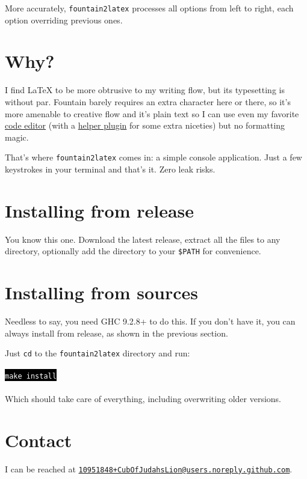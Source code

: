 \documentclass[11pt]{article}
\newcommand{\link}[2]{\textcolor{Blue}{\href{#1}{#2}}}
\newcommand{\cmdline}[1]{    \hspace{0.5in}\colorbox{Black}{\textcolor{White}{\texttt{#1}}}}
\begin{document}
More accurately, \texttt{fountain2latex} processes all options from
left to right, each option overriding previous ones.


\section*{Why?}

I find {\LaTeX} to be more obtrusive to my writing flow, but its
typesetting is without par. Fountain barely requires an extra
character here or there, so it's more amenable to creative flow
and it's plain text so I can use even my favorite
\link{https://www.vim.org/}{code editor} (with
a \link{https://github.com/kblin/vim-fountain}{helper plugin}
for some extra niceties) but no formatting magic.

That's where \texttt{fountain2latex} comes in: a simple console
application. Just a few keystrokes in your terminal and that's it.
Zero leak risks.


\section*{Installing from release}

You know this one. Download the latest release, extract all the files
to any directory, optionally add the directory to your \texttt{\$PATH}
for convenience.


\section*{Installing from sources}

Needless to say, you need GHC 9.2.8+ to do this. If you don't have it,
you can always install from release, as shown in the previous section.

Just \texttt{cd} to the \texttt{fountain2latex} directory and run:\\
\\
\cmdline{make install}\\
\\
Which should take care of everything, including overwriting older
versions.


\section*{Contact}

I can be reached at \texttt{\link{mailto:10951848+CubOfJudahsLion@users.noreply.github.com}{10951848+CubOfJudahsLion@users.noreply.github.com}}.\\
\end{document}
